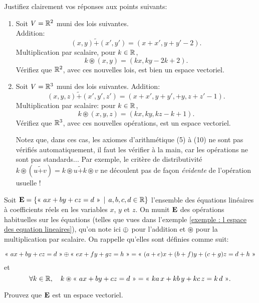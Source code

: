 \begin{prob} \label{prob04.12} Justifiez clairement vos
réponses aux points suivants:

\begin{enumerate}
\item
 Soit $V=\mathbb{R}^2$ muni des lois suivantes.\\ 
Addition:
  \[(x,y) \tilde+ (x',y')=(x+x', y+y'-2).\] 
Multiplication
  par scalaire, pour $k\in \mathbb{R}$, \[k\circledast (x,y)=(kx, ky-2k+2).\]
  Vérifiez que $\mathbb{R}^2$, avec ces nouvelles lois, est bien un
  espace vectoriel.
\item
  Soit $V=\mathbb{R}^3$ muni des lois suivantes. Addition:
  \[(x,y,z) \tilde+ (x',y',z')=(x+x', y+y', +y,z+z'-1).\] Multiplication
   par scalaire: pour $k\in \mathbb{R}$,
  \[k\circledast (x,y,z)=(kx, ky, kz-k+1).\] Vérifiez que $\mathbb{R}^3$, avec
  ces nouvelles opérations, est un espace vectoriel.

  Notez que, dans ces cas, les axiomes d'arithmétique (5) à (10) ne sont pas vérifiés automatiquement, il faut les vérifier à la main, car
  les opérations ne sont pas standards... Par exemple, le critère de distributivité
   $k\circledast (u \tilde+ v)  = k\circledast u \tilde+ k\circledast v$ ne d\'ecoulent pas de fa\c{c}on {\emph{évidente}} de l'opération usuelle !
\end{enumerate}
\end{prob}

\begin{prob} \label{prob04.13}  Soit
$\mathbf{E}=\{\text{«}\  ax+by+ cz=d \ \text{»}\, \mid \, a,b,c, d\in\mathbb{R}\}$ l'ensemble des équations
linéaires à coefficients réels en les variables $x$, $y$ et $z$.
On munit $\mathbf{E}$ des opérations habituelles sur les équations (telles que vues dans l'exemple \ref{exemple : l espace des equation lineaires}), qu'on note ici $\oplus$ pour l'addition et $\circledast$ pour la
multiplication par scalaire. On rappelle qu'elles sont définies comme
suit:

\[\text{«}\ ax+by+ cz=d\ \text{»} \oplus \text{«}\  ex+fy+gz=h \ \text{»} =\text{«}\  (a+e)x + (b+f)y + (c+g)z=d+h \ \text{»}\] et
\[\forall   k\in \mathbb{R},\quad    k\circledast\text{«}\  ax+by+ cz=d \ \text{»} = \text{«}\   ka\, x+ kb \,y+ kc \,z = k\,d \ \text{»}.\]

Prouvez que $\mathbf{E}$ est un espace vectoriel.
\end{prob}

